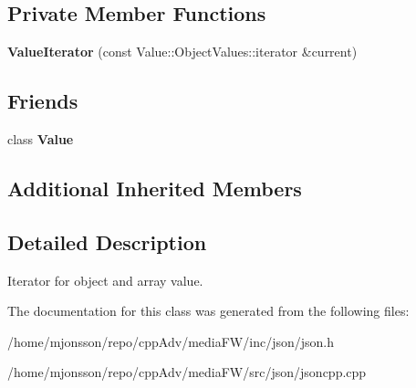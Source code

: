 \subsection*{Private Member Functions}
\begin{DoxyCompactItemize}
\item 
\mbox{\label{classJson_1_1ValueIterator_afb06ea21add440c78c27dc49570460a5}} 
{\bfseries Value\+Iterator} (const Value\+::\+Object\+Values\+::iterator \&current)
\end{DoxyCompactItemize}
\subsection*{Friends}
\begin{DoxyCompactItemize}
\item 
\mbox{\label{classJson_1_1ValueIterator_aeceedf6e1a7d48a588516ce2b1983d6f}} 
class {\bfseries Value}
\end{DoxyCompactItemize}
\subsection*{Additional Inherited Members}


\subsection{Detailed Description}
Iterator for object and array value. 

The documentation for this class was generated from the following files\+:\begin{DoxyCompactItemize}
\item 
/home/mjonsson/repo/cpp\+Adv/media\+F\+W/inc/json/json.\+h\item 
/home/mjonsson/repo/cpp\+Adv/media\+F\+W/src/json/jsoncpp.\+cpp\end{DoxyCompactItemize}
